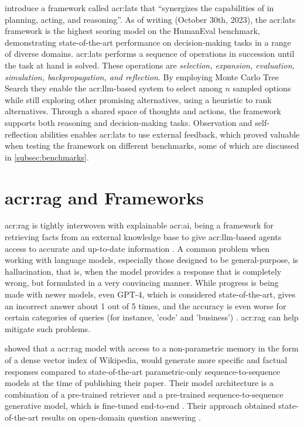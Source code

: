 \cite{zhouLanguageAgentTree2023} introduce a framework called \gls{acr:lats} that \enquote{synergizes the capabilities of  in planning, acting, and reasoning}. As of writing (October 30th, 2023), the \gls{acr:lats} framework is the highest scoring model on the HumanEval benchmark, demonstrating state-of-the-art performance on decision-making tasks in a range of diverse domains. \gls{acr:lats} performs a sequence of operations in succession until the task at hand is solved. These operations are \textit{selection, expansion, evaluation, simulation, backpropagation, and reflection}. By employing Monte Carlo Tree Search they enable the \acrshort{acr:llm}-based system to select among $n$ sampled options while still exploring other promising alternatives, using a heuristic to rank alternatives. Through a shared space of thoughts and actions, the framework supports both reasoning and decision-making tasks. Observation and self-reflection abilities enables \acrshort{acr:lats} to use external feedback, which proved valuable when testing the framework on different benchmarks, some of which are discussed in \autoref{subsec:benchmarks}.



\section[Retrieval Augmented Generation and Frameworks]{\acrlong{acr:rag} and Frameworks}\label{sec:retrieval-automented-generation}

\acrfull{acr:rag} is tightly interwoven with explainable \acrshort{acr:ai}, being a framework for retrieving facts from an external knowledge base to give \acrshort{acr:llm}-based agents access to accurate and up-to-date information \citep{martineauWhatRetrievalaugmentedGeneration2023}. A common problem when working with language models, especially those designed to be general-purpose, is hallucination, that is, when the model provides a response that is completely wrong, but formulated in a very convincing manner. While progress is being made with newer models, even GPT-4, which is considered state-of-the-art, gives an incorrect answer about 1 out of 5 times, and the accuracy is even worse for certain categories of queries (for instance, 'code' and 'business') \citep[10]{openaiGPT4TechnicalReport2023}. \acrlong{acr:rag} can help mitigate such problems.

\cite{lewisRetrievalAugmentedGenerationKnowledgeIntensive2020} showed that a \gls{acr:rag} model with access to a non-parametric memory in the form of a dense vector index of Wikipedia, would generate more specific and factual responses compared to state-of-the-art parametric-only sequence-to-sequence models at the time of publishing their paper. Their model architecture is a combination of a pre-trained retriever and a pre-trained sequence-to-sequence generative model, which is fine-tuned end-to-end \citep[2]{lewisRetrievalAugmentedGenerationKnowledgeIntensive2020}. Their approach obtained state-of-the-art results on open-domain question answering \citep[5-6]{lewisRetrievalAugmentedGenerationKnowledgeIntensive2020}.

